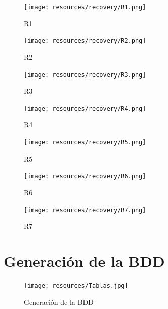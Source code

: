 \begin{figure}[h]
    \centering
    \texttt{[image: resources/recovery/R1.png]}
    \caption{R1}
\end{figure}

\begin{figure}[h]
    \centering
    \texttt{[image: resources/recovery/R2.png]}
    \caption{R2}
\end{figure}

\begin{figure}[h]
    \centering
    \texttt{[image: resources/recovery/R3.png]}
    \caption{R3}
\end{figure}

\begin{figure}[h]
    \centering
    \texttt{[image: resources/recovery/R4.png]}
    \caption{R4}
\end{figure}

\begin{figure}[h]
    \centering
    \texttt{[image: resources/recovery/R5.png]}
    \caption{R5}
\end{figure}

\begin{figure}[h]
    \centering
    \texttt{[image: resources/recovery/R6.png]}
    \caption{R6}
\end{figure}

\begin{figure}[h]
    \centering
    \texttt{[image: resources/recovery/R7.png]}
    \caption{R7}
\end{figure}

\clearpage

\section{Generación de la BDD}
\begin{figure}[h]
    \centering
    \texttt{[image: resources/Tablas.jpg]}
    \caption{Generación de la BDD}
\end{figure}
